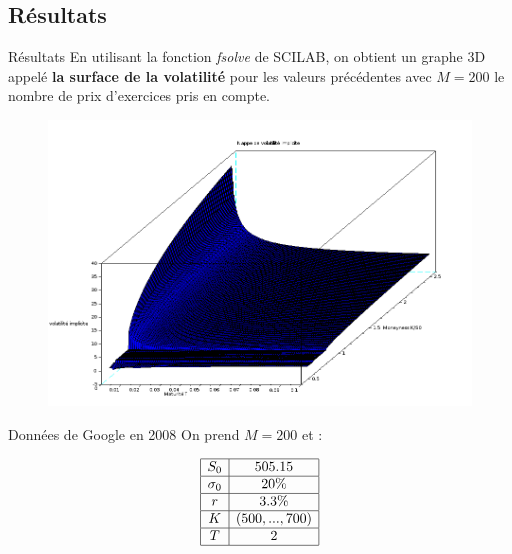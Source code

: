 \documentclass{beamer}
\begin{document}
\subsection{Résultats}


\begin{frame}{Résultats}
  En utilisant la fonction \textit{fsolve} de SCILAB, on obtient un graphe 3D appelé \textbf{la surface de la volatilité} pour les valeurs précédentes avec $M=200$ le nombre de prix d'exercices pris en compte.
    \begin{figure}
      \includegraphics[scale=0.20]{volimpl1.png}
    \end{figure}
\end{frame}

\begin{frame}{Données de Google en 2008}
  On prend $M = 200$ et :

    \[
      \begin{array}{|c|c|}
        \hline
        S_0 & 505.15 \\ \hline
        \sigma_0 & 20\% \\ \hline
        r & 3.3 \% \\ \hline
        K & (500,...,700) \\ \hline
        T & 2 \\ \hline
      \end{array}
    \]
\end{frame}
\end{document}
